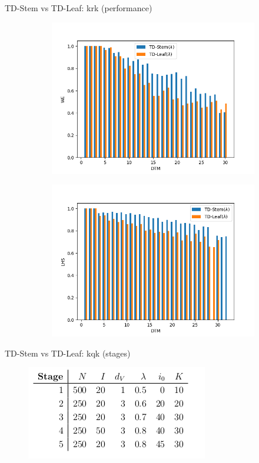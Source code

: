 \documentclass{beamer}
\begin{document}
\begin{frame}{TD-Stem vs TD-Leaf: krk (performance)}
\begin{figure}
\begin{subfigure}{0.4\textwidth}
			\includegraphics[scale=0.25]{fig/plots/krk_we}
		\end{subfigure}
		\begin{subfigure}{0.4\textwidth}
			\includegraphics[scale=0.25]{fig/plots/krk_lhs}
		\end{subfigure}
	\end{figure}
\end{frame}

\begin{frame}{TD-Stem vs TD-Leaf: kqk (stages)}
	\begin{figure}
		\includegraphics[scale=0.5]{exp2}
	\end{figure}
\end{frame}
\end{document}
